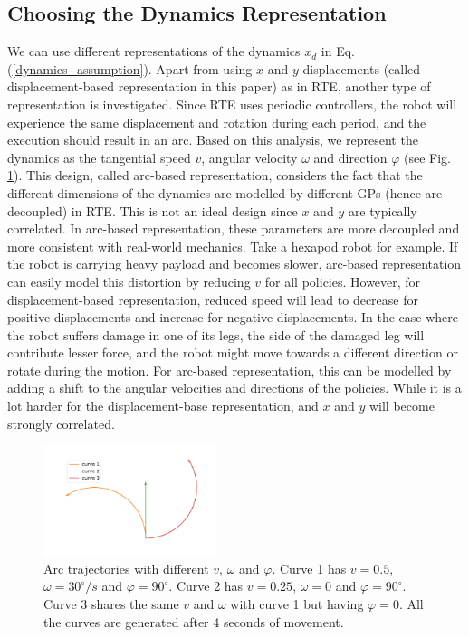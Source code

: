 \documentclass[journal]{IEEEtran}
\begin{document}
\subsection{Choosing the Dynamics Representation}
We can use different representations of the dynamics $x_d$ in Eq. (\ref{dynamics_assumption}).
Apart from using $x$ and $y$ displacements (called displacement-based representation in this paper) as in RTE, another type of representation is investigated.
Since RTE uses periodic controllers, the robot will experience the same displacement and rotation during each period, and the execution should result in an arc.
Based on this analysis, we represent the dynamics as the tangential speed $v$, angular velocity $\omega$ and direction $\varphi$ (see Fig. \ref{arcs}). 
This design, called arc-based representation, considers the fact that the different dimensions of the dynamics are modelled by different GPs (hence are decoupled) in RTE.
This is not an ideal design since $x$ and $y$ are typically correlated.
In arc-based representation, these parameters are more decoupled and more consistent with real-world mechanics. 
Take a hexapod robot for example.
If the robot is carrying heavy payload and becomes slower, arc-based representation can easily model this distortion by reducing $v$ for all policies. However, for displacement-based representation, reduced speed will lead to decrease for positive displacements and increase for negative displacements.
In the case where the robot suffers damage in one of its legs, the side of the damaged leg will contribute lesser force, and the robot might move towards a different direction or rotate during the motion.
For arc-based representation, this can be modelled by adding a shift to the angular velocities and directions of the policies.
While it is a lot harder for the displacement-base representation, and $x$ and $y$ will become strongly correlated.
\begin{figure}[h]
\centering
\includegraphics[width=0.45\textwidth]{example_curves.pdf}
\caption{Arc trajectories with different $v$, $\omega$ and $\varphi$. Curve 1 has $v=0.5$, $\omega = 30^\circ/s$ and $\varphi = 90^\circ$. Curve 2 has $v=0.25$, $\omega = 0$ and $\varphi = 90^\circ$.
Curve 3 shares the same $v$ and $\omega$ with curve 1 but having $\varphi = 0$.
All the curves are generated after 4 seconds of movement.
}
\label{arcs}
\end{figure}
\end{document}

